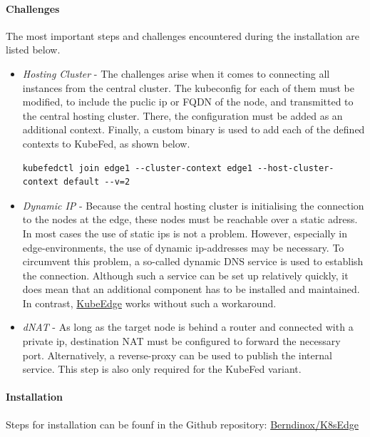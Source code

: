 \documentclass[MSC,Master,english]{twbook}%
\begin{document}
\paragraph{Challenges} The most important steps and challenges encountered during the installation are listed below.

\begin{itemize}
    \item \textit{Hosting Cluster} - The challenges arise when it comes to connecting all instances from the central cluster. The kubeconfig for each of them must be modified, to include the puclic ip or \ac{FQDN} of the node, and transmitted to the central hosting cluster. There, the configuration must be added as an additional context. Finally, a custom binary is used to add each of the defined contexts to \ac{KubeFed}, as shown below.

    \begin{lstlisting}[caption={KubeFed join context},captionpos=b]
    kubefedctl join edge1 --cluster-context edge1 --host-cluster-context default --v=2
    \end{lstlisting}

    \item \textit{Dynamic IP} - Because the central hosting cluster is initialising the connection to the  nodes at the edge, these nodes must be reachable over a static adress. In most cases the use of static ips is not a problem. However, especially in edge-environments, the use of dynamic ip-addresses may be necessary. To circumvent this problem, a so-called dynamic \ac{DNS} service is used to establish the connection. Although such a service can be set up relatively quickly, it does mean that an additional component has to be installed and maintained. In contrast, \hyperref[sec:dsrenvke]{KubeEdge} works without such a workaround.
    
    \item \textit{dNAT} - As long as the target node is behind a router and connected with a private ip, destination \ac{NAT} must be configured to forward the necessary port. Alternatively, a reverse-proxy can be used to publish the internal service. This step is also only required for the KubeFed variant. 
\end{itemize}
\paragraph{Installation} Steps for installation can be founf in the Github repository: \hyperref{https://github.com/Berndinox/K8sEdge/blob/main/DOCs/kubefed-install.md}{}{}{Berndinox/K8sEdge}
\end{document}
